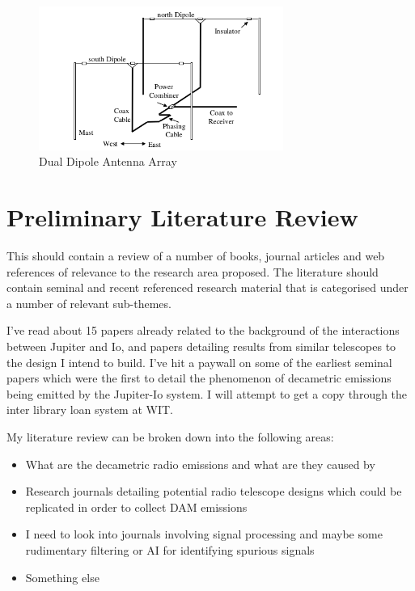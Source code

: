 \documentclass[runningheads,a4paper]{llncs}
\begin{document}
%
\begin{figure}[here]
\centering
\includegraphics[width=8cm]{images/08}
\caption{Dual Dipole Antenna Array \citep{nasa12}}
\label{fig:dual_dipole_antenna_array}
\end{figure}
%

%
%
\newpage
\section*{Preliminary Literature Review}
This should contain a review of a number of books, journal articles and web references of relevance to the research area proposed. The literature should contain seminal and recent referenced research material that is categorised under a number of relevant sub-themes.


I've read about 15 papers already related to the background of the interactions between Jupiter and Io, and papers detailing results from similar telescopes to the design I intend to build. I've hit a paywall on some of the earliest seminal papers which were the first to detail the phenomenon of decametric emissions being emitted by the Jupiter-Io system. I will attempt to get a copy through the inter library loan system at WIT.


My literature review can be broken down into the following areas:

\begin{itemize}
  \item What are the decametric radio emissions and what are they caused by
  \item Research journals detailing potential radio telescope designs which could be replicated in order to collect DAM emissions
  \item I need to look into journals involving signal processing and maybe some rudimentary filtering or AI for identifying spurious signals
  \item Something else
  
\end{itemize}
%
%
\newpage
\end{document}
